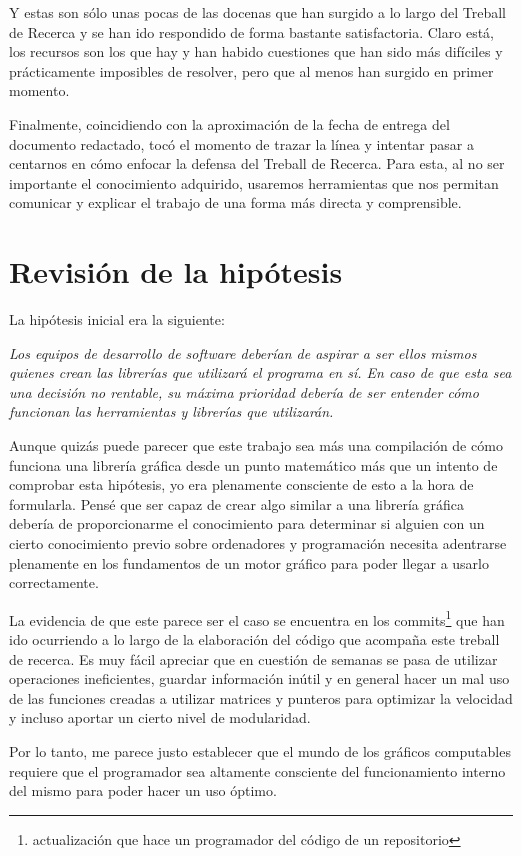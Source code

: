 Y estas son sólo unas pocas de las docenas que han surgido a lo largo del Treball de Recerca y se han ido respondido de forma bastante satisfactoria. Claro está, los recursos son los que hay y han habido cuestiones que han sido más difíciles y prácticamente imposibles de resolver, pero que al menos han surgido en primer momento.


\newpage
Finalmente, coincidiendo con la aproximación de la fecha de entrega del documento redactado, tocó el momento de trazar la línea y intentar pasar a centarnos en cómo enfocar la defensa del Treball de Recerca. Para esta, al no ser importante el conocimiento adquirido, usaremos herramientas que nos permitan comunicar y explicar el trabajo de una forma más directa y comprensible.

\section{Revisión de la hipótesis}
La hipótesis inicial era la siguiente:

\textit{Los equipos de desarrollo de software deberían de aspirar a ser ellos mismos quienes crean las librerías que utilizará el programa en sí. En caso de que esta sea una decisión no rentable, su máxima prioridad debería de ser entender cómo funcionan las herramientas y librerías que utilizarán.}

Aunque quizás puede parecer que este trabajo sea más una compilación de cómo funciona una librería gráfica desde un punto matemático más que un intento de comprobar esta hipótesis, yo era plenamente consciente de esto a la hora de formularla. Pensé que ser capaz de crear algo similar a una librería gráfica debería de proporcionarme el conocimiento para determinar si alguien con un cierto conocimiento previo sobre ordenadores y programación necesita adentrarse plenamente en los fundamentos de un motor gráfico para poder llegar a usarlo correctamente.

La evidencia de que este parece ser el caso se encuentra en los commits\footnote{actualización que hace un programador del código de un repositorio} que han ido ocurriendo a lo largo de la elaboración del código que acompaña este treball de recerca. Es muy fácil apreciar que en cuestión de semanas se pasa de utilizar operaciones ineficientes, guardar información inútil y en general hacer un mal uso de las funciones creadas a utilizar matrices y punteros para optimizar la velocidad y incluso aportar un cierto nivel de modularidad.

Por lo tanto, me parece justo establecer que el mundo de los gráficos computables requiere que el programador sea altamente consciente del funcionamiento interno del mismo para poder hacer un uso óptimo.

